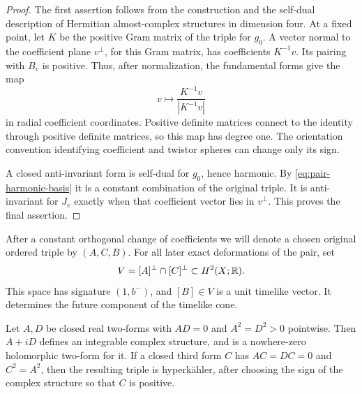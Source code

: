\begin{proof}
The first assertion follows from the construction and the
self-dual description of Hermitian almost-complex structures in
dimension four. At a fixed point, let $K$ be the positive Gram matrix
of the triple for $g_0$. A vector normal to the coefficient plane
$v^\perp$, for this Gram matrix, has coefficients $K^{-1}v$.
Its pairing with $B_v$ is positive. Thus, after normalization, the
fundamental forms give the map
\[
 v\longmapsto\frac{K^{-1}v}{|K^{-1}v|}
\]
in radial coefficient coordinates. Positive definite matrices connect to the
identity through positive definite matrices, so this map has degree
one. The orientation convention identifying coefficient and twistor
spheres can change only its sign.

A closed anti-invariant form is self-dual for $g_0$, hence harmonic.
By \eqref{eq:pair-harmonic-basis} it is a constant combination of the
original triple. It is anti-invariant for $J_v$ exactly when that
coefficient vector lies in $v^\perp$. This proves the final assertion.
\end{proof}

After a constant orthogonal change of coefficients we will denote a
chosen original ordered triple by $(A,C,B)$. For all later exact
deformations of the pair, set
\begin{equation}\label{eq:pair-lorentz-space}
 V=[A]^\perp\cap[C]^\perp\subset H^2(X;\mathbb R).
\end{equation}
This space has signature $(1,b^-)$, and $[B]\in V$ is a unit timelike
vector. It determines the future component of the timelike cone.

\begin{lemma}\label{lem:complex-symplectic}
Let $A,D$ be closed real two-forms with
$AD=0$ and $A^2=D^2>0$ pointwise. Then $A+iD$ defines an integrable
complex structure, and is a nowhere-zero holomorphic two-form for it.
If a closed third form $C$ has $AC=DC=0$ and $C^2=A^2$, then the
resulting triple is hyperk\"ahler, after choosing the sign of the
complex structure so that $C$ is positive.
\end{lemma}

